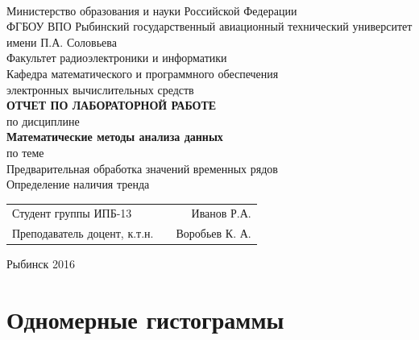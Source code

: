 \documentclass[a4paper,12pt]{article}
\begin{document}
\begin{titlepage}
\newpage

\

\begin{center}
	\large		
   	Министерство образования и науки Российской Федерации\\[0.5cm]
    	
	ФГБОУ ВПО Рыбинский государственный авиационный технический университет имени П.А. Соловьева\\[1.0cm]

	Факультет радиоэлектроники и информатики\\[0.25cm]
		
	Кафедра математического и программного обеспечения\\ электронных вычислительных средств\\[1.5cm]

	\Large
	\textbf{\textsc{ОТЧЕТ ПО ЛАБОРАТОРНОЙ РАБОТЕ}}\\[0.25cm]
	по  дисциплине\\
	\textbf{Математические методы анализа данных}\\[0.5cm]
	
	по теме\\
	Предварительная обработка значений временных рядов\\ Определение наличия тренда

\end{center}

\vfill	
\begin{tabularx}{0.95\textwidth}{lXr}
Студент группы ИПБ-13 			& &	Иванов Р.А. \\
Преподаватель доцент, к.т.н.	& & Воробьев К. А.\\
\end{tabularx}

\vspace{1.5cm}
\center Рыбинск 2016
\end{titlepage}	

\tableofcontents

\newpage\section{Одномерные гистограммы} 
\end{document}
